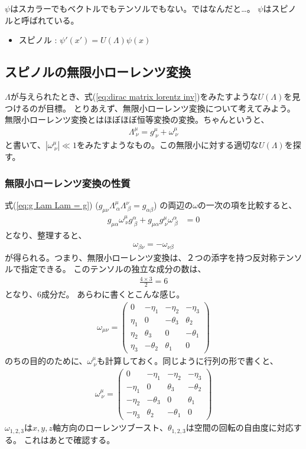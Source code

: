 \documentclass[10pt,a4paper]{jarticle}
\begin{document}
$\psi$はスカラーでもベクトルでもテンソルでもない。ではなんだと…。
$\psi$はスピノルと呼ばれている。
\begin{itemize}
\item スピノル  : $\psi'(x') = U(\Lambda) \psi(x)$
\end{itemize}


\subsection{スピノルの無限小ローレンツ変換}
$\Lambda$が与えられたとき、式(\ref{eq:dirac matrix lorentz inv})をみたすような$U(\Lambda)$を見つけるのが目標。
とりあえず、無限小ローレンツ変換について考えてみよう。
無限小ローレンツ変換とはほぼほぼ恒等変換の変換。ちゃんというと、
\begin{align}
\Lambda^\mu_{~\nu} = g^\mu_{~\nu} + \omega^{\mu}_{~\nu}
\end{align}
と書いて、$|\omega^{\mu}_{~\nu}| \ll 1$をみたすようなもの。この無限小に対する適切な$U(\Lambda)$を探す。

\subsubsection{無限小ローレンツ変換の性質}
式(\ref{eq:g Lam Lam = g}) ($g_{\mu\nu} \Lambda^\mu_{~\alpha} \Lambda^\nu_{~\beta} = g_{\alpha\beta}$) の両辺の$\omega$の一次の項を比較すると、
\begin{align}
g_{\mu\alpha} \omega^\mu_{~\nu} g^\alpha_{~\beta} + g_{\mu\alpha} g^\mu_{~\nu} \omega^\alpha_{~\beta} &= 0
\end{align}
となり、整理すると、
\begin{align}
\omega_{\beta\nu} = -\omega_{\nu\beta}
\end{align}
が得られる。つまり、無限小ローレンツ変換は、２つの添字を持つ反対称テンソルで指定できる。
このテンソルの独立な成分の数は、
\begin{align}
\frac{4 \times 3}{2} = 6
\end{align}
となり、6成分だ。
あらわに書くとこんな感じ。
\begin{align}
\omega_{\mu\nu}
= 
\left(\begin{array}{cccc}
0 & -\eta_1 & -\eta_2 & -\eta_3 \\
\eta_1 & 0 & -\theta_3 & \theta_2 \\
\eta_2 & \theta_3 & 0 & -\theta_1 \\
\eta_3 & -\theta_2 & \theta_1 & 0
\end{array}\right)
\end{align}
のちの目的のために、$\omega^\mu_{~\nu}$も計算しておく。同じように行列の形で書くと、
\begin{align}
\omega^\mu_{~\nu}
= 
\left(\begin{array}{cccc}
0 & -\eta_1 & -\eta_2 & -\eta_3 \\
-\eta_1 & 0 & \theta_3 & -\theta_2 \\
-\eta_2 & -\theta_3 & 0 & \theta_1 \\
-\eta_3 & \theta_2 & -\theta_1 & 0
\end{array}\right)
\end{align}
$\omega_{1,2,3}$は$x,y,z$軸方向のローレンツブースト、$\theta_{1,2,3}$は空間の回転の自由度に対応する。
これはあとで確認する。
\end{document}
